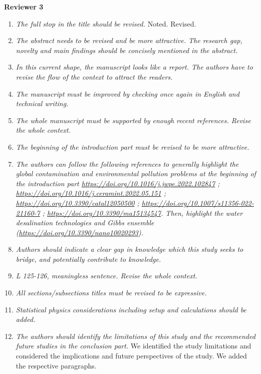 \documentclass[12pt]{dinbrief}
\begin{document}
\textbf{Reviewer 3}

\textit{}
\begin{enumerate}
\item \textit{The full stop in the title should be revised.}
Noted. Revised.
\item \textit{The abstract needs to be revised and be more attractive. The research gap, novelty and main findings should be concisely mentioned in the abstract.}
\item \textit{In this current shape, the manuscript looks like a report. The authors have to revise the flow of the context to attract the readers.}
\item \textit{The manuscript must be improved by checking once again in English and technical writing. }

\item \textit{The whole manuscript must be supported by enough recent references. Revise the whole context.}
\item \textit{The beginning of the introduction part must be revised to be more attractive.}
\item \textit{The authors can follow the following references to generally highlight the global contamination and environmental pollution problems at the beginning of the introduction part  \href{https://doi.org/10.1016/j.jwpe.2022.102847}{https://doi.org/10.1016/j.jwpe.2022.102847} ; \href{https://doi.org/10.1016/j.ceramint.2022.05.151}{https://doi.org/10.1016/j.ceramint.2022.05.151} ; 
\href{https://doi.org/10.3390/catal12050500}{https://doi.org/10.3390/catal12050500} ; 
\href{https://doi.org/10.1007/s11356-022-21160-7}{https://doi.org/10.1007/s11356-022-21160-7} ; 
\href{https://doi.org/10.3390/ma15134547}{https://doi.org/10.3390/ma15134547}. 
Then, highlight the water desalination technologies and Gibbs ensemble (\href{https://doi.org/10.3390/nano10020293}{https://doi.org/10.3390/nano10020293}).}
\item \textit{Authors should indicate a clear gap in knowledge which this study seeks to bridge, and potentially contribute to knowledge. }

\item \textit{L 125-126, meaningless sentence. Revise the whole context.}
\item \textit{All sections/subsections titles must be revised to be expressive.}
\item \textit{Statistical physics considerations including setup and calculations should be added.}
\item \textit{The authors should identify the limitations of this study and the recommended future studies in the conclusion part.
}
We identified the study limitations and considered the implications and future perspectives of the study. We added the respective paragraphs.
\end{enumerate}








\end{document}
